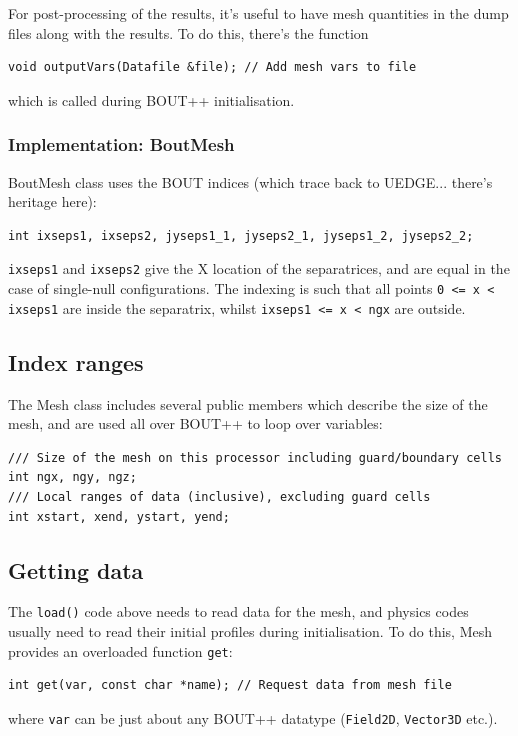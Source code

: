 \documentclass[12pt]{article}
\newcommand{\code}[1]{\texttt{#1}}
\begin{document}
For post-processing of the results, it's useful to have 
mesh quantities in the dump files along with the results. To do this,
there's the function
\begin{lstlisting}
void outputVars(Datafile &file); // Add mesh vars to file
\end{lstlisting}
which is called during BOUT++ initialisation.

\subsubsection{Implementation: BoutMesh}

BoutMesh class uses the BOUT indices (which trace back to UEDGE... there's
heritage here):
\begin{lstlisting}
int ixseps1, ixseps2, jyseps1_1, jyseps2_1, jyseps1_2, jyseps2_2;
\end{lstlisting}
\code{ixseps1} and \code{ixseps2} give the X location of the separatrices,
and are equal in the case of single-null configurations. The indexing
is such that all points \code{0 <= x < ixseps1} are inside the separatrix,
whilst \code{ixseps1 <= x < ngx} are outside.

\subsection{Index ranges}

The Mesh class includes several public members which describe the
size of the mesh, and are used all over BOUT++ to loop over variables:
\begin{lstlisting}
/// Size of the mesh on this processor including guard/boundary cells
int ngx, ngy, ngz;  
/// Local ranges of data (inclusive), excluding guard cells
int xstart, xend, ystart, yend;
\end{lstlisting}

\subsection{Getting data}

The \code{load()} code above needs to read data for the mesh, and physics
codes usually need to read their initial profiles during initialisation.
To do this, Mesh provides an overloaded function \code{get}:
\begin{lstlisting}
int get(var, const char *name); // Request data from mesh file
\end{lstlisting}
where \code{var} can be just about any BOUT++ datatype (\code{Field2D},
\code{Vector3D} etc.). 
\end{document}
